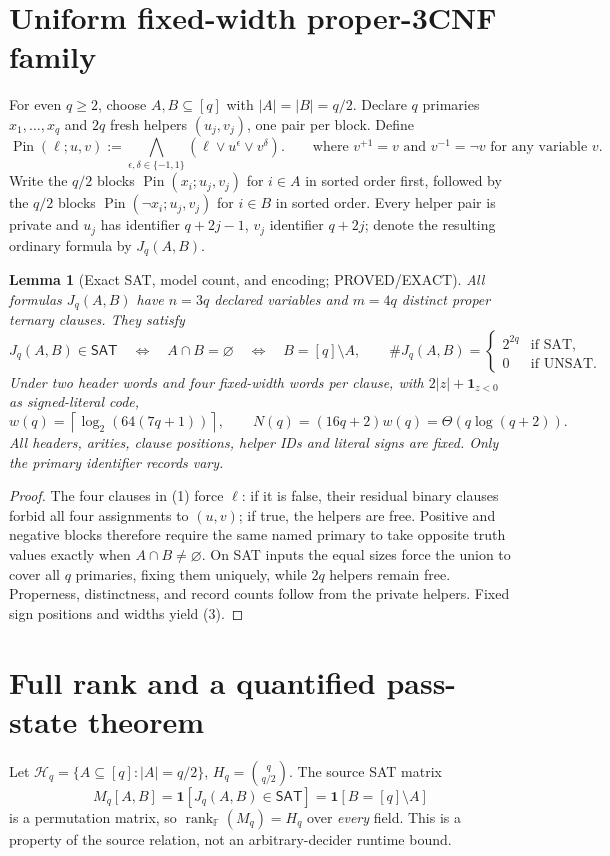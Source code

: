 \documentclass[11pt]{article}
\newtheorem{lemma}[theorem]{Lemma}
\newcommand{\SAT}{\mathsf{SAT}}
\begin{document}
\section{Uniform fixed-width proper-3CNF family}
For even $q\ge2$, choose $A,B\subseteq[q]$ with $|A|=|B|=q/2$. Declare $q$ primaries $x_1,\ldots,x_q$ and $2q$ fresh helpers $(u_j,v_j)$, one pair per block. Define
\[
\operatorname{Pin}(\ell;u,v):=\bigwedge_{\epsilon,\delta\in\{-1,1\}}(\ell\vee u^\epsilon\vee v^\delta).
\qquad\text{where }v^{+1}=v\text{ and }v^{-1}=\neg v\text{ for any variable }v.
\tag{1}
\]
Write the $q/2$ blocks $\operatorname{Pin}(x_i;u_j,v_j)$ for $i\in A$ in sorted order first, followed by the $q/2$ blocks $\operatorname{Pin}(\neg x_i;u_j,v_j)$ for $i\in B$ in sorted order. Every helper pair is private and $u_j$ has identifier $q+2j-1$, $v_j$ identifier $q+2j$; denote the resulting ordinary formula by $J_q(A,B)$.

\begin{lemma}[Exact SAT, model count, and encoding; PROVED/EXACT]
All formulas $J_q(A,B)$ have $n=3q$ declared variables and $m=4q$ distinct proper ternary clauses. They satisfy
\[
J_q(A,B)\in\SAT\quad\Longleftrightarrow\quad A\cap B=\varnothing
\quad\Longleftrightarrow\quad B=[q]\setminus A,
\qquad
\# J_q(A,B)=\begin{cases}2^{2q}&\text{if SAT},\\0&\text{if UNSAT}.\end{cases}
\tag{2}
\]
Under two header words and four fixed-width words per clause, with $2|z|+\mathbf1_{z<0}$ as signed-literal code,
\[
w(q)=\left\lceil\log_2(64(7q+1))\right\rceil,\qquad
N(q)=(16q+2)w(q)=\Theta(q\log(q+2)).
\tag{3}
\]
All headers, arities, clause positions, helper IDs and \emph{literal signs} are fixed. Only the primary \emph{identifier records} vary.
\end{lemma}
\begin{proof}
The four clauses in (1) force $\ell$: if it is false, their residual binary clauses forbid all four assignments to $(u,v)$; if true, the helpers are free. Positive and negative blocks therefore require the same named primary to take opposite truth values exactly when $A\cap B\ne\varnothing$. On SAT inputs the equal sizes force the union to cover all $q$ primaries, fixing them uniquely, while $2q$ helpers remain free. Properness, distinctness, and record counts follow from the private helpers. Fixed sign positions and widths yield (3).
\end{proof}

\section{Full rank and a quantified pass-state theorem}
Let $\mathcal H_q=\{A\subseteq[q]:|A|=q/2\}$, $H_q=\binom q{q/2}$. The source SAT matrix
\[
M_q[A,B]=\mathbf1[J_q(A,B)\in\SAT]=\mathbf1[B=[q]\setminus A]
\tag{4}
\]
is a permutation matrix, so $\operatorname{rank}_{\mathbb F}(M_q)=H_q$ over \emph{every} field. This is a property of the source relation, not an arbitrary-decider runtime bound.
\end{document}
